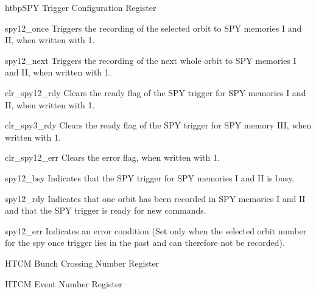 \begin{register}{htbp}{SPY Trigger Configuration Register}{}%
    \label{spy_trig_cfg_reg}%
    \regnewline%

    \begin{regdesc}
    \begin{reglist}
        \item [spy12\_once] Triggers the recording of the selected orbit to SPY memories I and II, when written with 1.
        \item [spy12\_next] Triggers the recording of the next whole orbit to SPY memories I and II, when written with 1.
        \item [clr\_spy12\_rdy] Clears the ready flag of the SPY trigger for SPY memories I and II, when written with 1.
        \item [clr\_spy3\_rdy] Clears the ready flag of the SPY trigger for SPY memory III, when written with 1.
        \item [clr\_spy12\_err] Clears the error flag, when written with 1.
        \item [spy12\_bsy] Indicates that the SPY trigger for SPY memories I and II is busy.
        \item [spy12\_rdy] Indicates that one orbit has been recorded in SPY memories I and II and that the SPY trigger is ready for new commands.
        \item [spy12\_err] Indicates an error condition (Set only when the selected orbit number for the spy once trigger lies in the past and can therefore not be recorded).
    \end{reglist}
    \end{regdesc}
\end{register}

\begin{register}{H}{TCM Bunch Crossing Number Register}{}%
    \label{tcm_bx_nr}
    \begin{regdesc}
    \end{regdesc}
\end{register}

\begin{register}{H}{TCM Event Number Register}{}%
    \label{tcm_ev_nr}
    \begin{regdesc}
    \end{regdesc}
\end{register}

